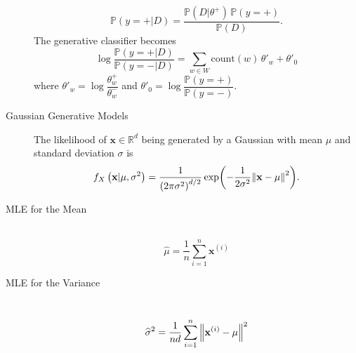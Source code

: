\documentclass[10pt,landscape,a4paper]{article}
\begin{document}
\begin{multicols*}{3}
\begin{description}
	$$\mathbb{P}\left(y=+|D\right)=\dfrac{\mathbb{P}(D|\theta^+)\,\mathbb{P}(y=+)}{\mathbb{P}(D)}.$$
	The generative classifier becomes
	$$\log\dfrac{\mathbb{P}\left(y=+|D\right)}{\mathbb{P}\left(y=-|D\right)}=\sum_{w\in W}\text{count}(w)\,\theta'_w+\theta'_0$$
	where $\theta'_w=\log\dfrac{\theta^+_w}{\theta^-_w}$ and $\theta'_0=\log\dfrac{\mathbb{P}(y=+)}{\mathbb{P}(y=-)}$.
	\item[Gaussian Generative Models] The likelihood of $\mathbf{x}\in\mathbb{R}^d$ being generated by a Gaussian with mean $\mu$ and standard deviation $\sigma$ is
	$$f_X\left(\mathbf{x}|\mu,\sigma^2\right)=\dfrac{1}{\left(2\pi\sigma^2\right)^{d/2}}\exp(-\dfrac{1}{2\sigma^2}\norm{\mathbf{x}-\mu}^2).$$
	\item[MLE for the Mean] ~
	$$\widehat{\mu}=\frac{1}{n}\sum_{i=1}^{n}\mathbf{x}^{(i)}$$
	\item[MLE for the Variance] ~
	$$\widehat{\sigma}^2=\frac{1}{nd}\sum_{i=1}^{n}\norm{\mathbf{x}^{(i)}-\mu}^2$$
\end{description}


\end{multicols*}
\end{document}
